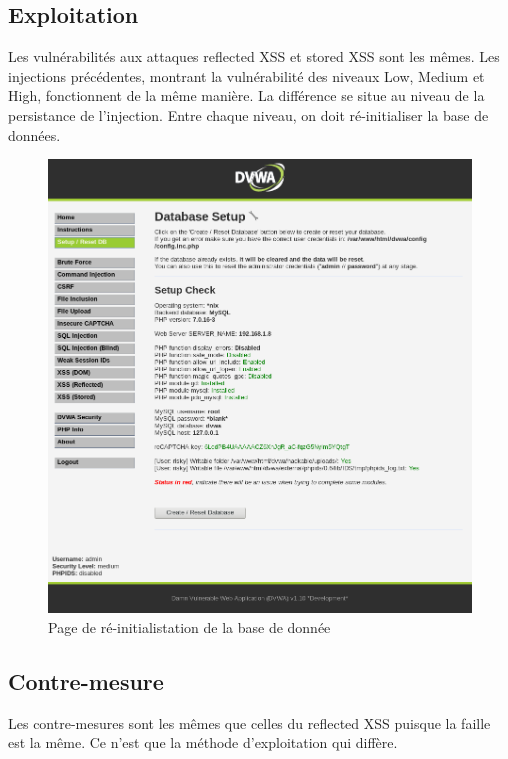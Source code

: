 \subsection{Exploitation}
Les vulnérabilités aux attaques reflected XSS et stored XSS sont les mêmes. Les injections précédentes, montrant la vulnérabilité des niveaux Low, Medium et High,
fonctionnent de la même manière. La différence se situe au niveau de la persistance de l'injection. Entre chaque niveau, on doit ré-initialiser la base de données. 
\begin{figure}[H]
	\begin{center}
		\includegraphics[scale=\scaledvwa]{images/xss/hack4.png}
		\caption{Page de ré-initialistation de la base de donnée} 
		\label{hack4}
	\end{center}
\end{figure}


\subsection{Contre-mesure}

Les contre-mesures sont les mêmes que celles du reflected XSS puisque la faille est la même. Ce  n'est que la méthode d'exploitation qui diffère.

\clearpage
